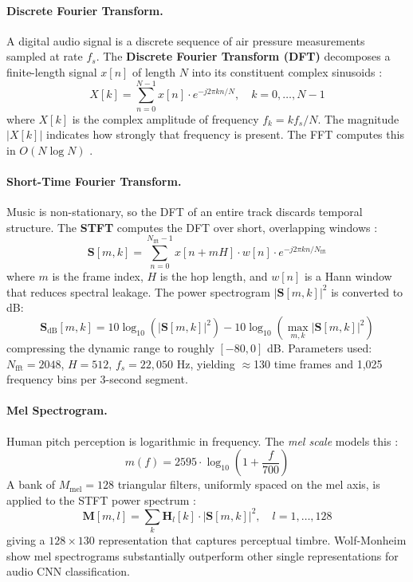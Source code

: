 \documentclass[10pt, twocolumn, a4paper]{article}
\begin{document}
\paragraph{Discrete Fourier Transform.}
A digital audio signal is a discrete sequence of air pressure measurements sampled at rate $f_s$. The \textbf{Discrete Fourier Transform (DFT)} decomposes a finite-length signal $x[n]$ of length $N$ into its constituent complex sinusoids \cite{oppenheim2010}:
\[
    X[k] = \sum_{n=0}^{N-1} x[n] \cdot e^{-j 2\pi k n / N}, \quad k = 0, \ldots, N-1
\]
where $X[k]$ is the complex amplitude of frequency $f_k = k f_s / N$. The magnitude $|X[k]|$ indicates how strongly that frequency is present. The FFT computes this in $O(N \log N)$ \cite{cooley1965}.

\paragraph{Short-Time Fourier Transform.}
Music is non-stationary, so the DFT of an entire track discards temporal structure. The \textbf{STFT} computes the DFT over short, overlapping windows \cite{allen1977}:
\[
    \mathbf{S}[m, k] = \sum_{n=0}^{N_{\text{fft}}-1} x[n + m H] \cdot w[n] \cdot e^{-j 2\pi k n / N_{\text{fft}}}
\]
where $m$ is the frame index, $H$ is the hop length, and $w[n]$ is a Hann window that reduces spectral leakage. The power spectrogram $|\mathbf{S}[m,k]|^2$ is converted to dB:
\[
    \mathbf{S}_{\text{dB}}[m, k] = 10 \log_{10}\!\left( |\mathbf{S}[m, k]|^2 \right) - 10 \log_{10}\!\left( \max_{m,k} |\mathbf{S}[m, k]|^2 \right)
\]
compressing the dynamic range to roughly $[-80, 0]$ dB. Parameters used: $N_{\text{fft}}=2048$, $H=512$, $f_s=22{,}050$ Hz, yielding $\approx$130 time frames and 1,025 frequency bins per 3-second segment.

\paragraph{Mel Spectrogram.}
Human pitch perception is logarithmic in frequency. The \textit{mel scale} models this \cite{oshaughnessy1987}:
\[
    m(f) = 2595 \cdot \log_{10}\!\left(1 + \frac{f}{700}\right)
\]
A bank of $M_{\text{mel}}=128$ triangular filters, uniformly spaced on the mel axis, is applied to the STFT power spectrum \cite{davis1980}:
\[
    \mathbf{M}[m, l] = \sum_{k} \mathbf{H}_l[k] \cdot |\mathbf{S}[m, k]|^2, \quad l = 1, \ldots, 128
\]
giving a $128 \times 130$ representation that captures perceptual timbre. Wolf-Monheim \cite{wolfmonheim2024} show mel spectrograms substantially outperform other single representations for audio CNN classification.
\end{document}
